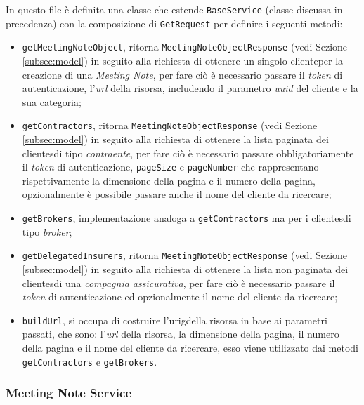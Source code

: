 In questo file è definita una classe che estende \lstinline{BaseService} (classe discussa in precedenza) con la composizione di \lstinline{GetRequest} per definire i seguenti metodi:
\begin{itemize}
    \item \lstinline{getMeetingNoteObject}, ritorna \lstinline{MeetingNoteObjectResponse} (vedi Sezione \ref{subsec:model}) in seguito alla richiesta di ottenere un singolo \gls{cliente}\glsoccur per la creazione di una \emph{Meeting Note}, per fare ciò è necessario passare il \emph{token} di autenticazione, l'\emph{url} della risorsa, includendo il parametro \emph{uuid} del cliente e la sua categoria;
    \item \lstinline{getContractors}, ritorna \lstinline{MeetingNoteObjectResponse} (vedi Sezione \ref{subsec:model}) in seguito alla richiesta di ottenere la lista paginata dei \glspl{cliente}\glsoccur di tipo \emph{contraente}, per fare ciò è necessario passare obbligatoriamente il \emph{token} di autenticazione, \lstinline{pageSize} e \lstinline{pageNumber} che rappresentano rispettivamente la dimensione della pagina e il numero della pagina, opzionalmente è possibile passare anche il nome del \gls{cliente} da ricercare;
    \item \lstinline{getBrokers}, implementazione analoga a \lstinline{getContractors} ma per i \glspl{cliente}\glsoccur di tipo \emph{broker};
    \item \lstinline{getDelegatedInsurers}, ritorna \lstinline{MeetingNoteObjectResponse} (vedi Sezione \ref{subsec:model}) in seguito alla richiesta di ottenere la lista non paginata dei \glspl{cliente}\glsoccur di una \emph{compagnia assicurativa}, per fare ciò è necessario passare il \emph{token} di autenticazione ed opzionalmente il nome del \gls{cliente} da ricercare;
    \item \lstinline{buildUrl}, si occupa di costruire l'\gls{urig}\glsoccur della risorsa in base ai parametri passati, che sono: l'\emph{url} della risorsa, la dimensione della pagina, il numero della pagina e il nome del \gls{cliente} da ricercare, esso viene utilizzato dai metodi \lstinline{getContractors} e \lstinline{getBrokers}.
\end{itemize}

\subsubsection*{Meeting Note Service}
\label{subsubsec:meeting-note-service}

